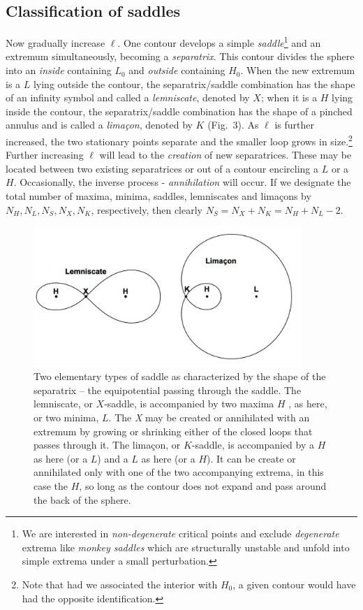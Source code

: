 \documentclass[12pt]{article}
\begin{document}
\subsection{Classification of saddles}
Now gradually increase $\ell$. One contour develops a simple \emph{saddle}\footnote{We are interested in \emph{non-degenerate} critical points and exclude \emph{degenerate} extrema like \emph{monkey saddles} which are structurally unstable and unfold into simple extrema under a small perturbation.} and an extremum simultaneously, becoming a \emph{separatrix}. This contour divides the sphere into an \emph{inside} containing $L_0$ and \emph{outside} containing $H_0$. When the new extremum is a $L$ lying outside the contour, the separatrix/saddle combination has the shape of an infinity symbol and called a \emph{lemniscate}, denoted by $X$; when it is a $H$ lying inside the contour, the separatrix/saddle combination has the shape of a pinched annulus and is called a \emph{lima\c con}, denoted by $K$ (Fig.~3). As $\ell$ is further increased, the two stationary points separate and the smaller loop grows in size.\footnote{Note that had we associated the interior with $H_0$, a given contour would have had the opposite identification.} Further increasing $\ell$ will lead to the \emph{creation} of new separatrices. These may be located between two existing separatrices or out of a contour encircling a $L$ or a $H$.  Occasionally, the inverse process - \emph{annihilation} will occur. If we designate the total  number of maxima, minima, saddles, lemniscates and lima\c cons by $N_H,N_L,N_S,N_X,N_K$, respectively, then clearly $N_S=N_X+N_K=N_H+N_L-2$. 

\begin{figure}[h!]
\centering
\includegraphics[width=4in]{fig3.jpg} 
\caption{Two elementary types of saddle as characterized by the shape of the separatrix -- the equipotential passing through the saddle. The lemniscate, or $X$-saddle, is accompanied by two maxima $H$ , as here, or two minima, $L$. The \emph X may be created or annihilated with an extremum by growing or shrinking either of the closed loops that passes through it. The lima\c con, or $K$-saddle, is accompanied by a $H$ as here (or a $L$) and a $L$ as here (or a $H$). It can be create or annihilated only with one of the two accompanying extrema, in this case the $H$, so long as the contour does not expand and pass around the back of the sphere.}
\end{figure}
\end{document}
